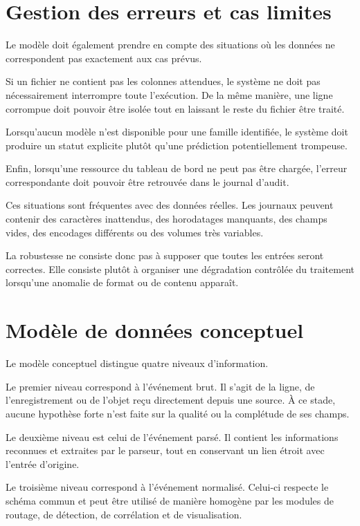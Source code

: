 \section{Gestion des erreurs et cas limites}

Le modèle doit également prendre en compte des situations où les données ne correspondent pas exactement aux cas prévus.

Si un fichier ne contient pas les colonnes attendues, le système ne doit pas nécessairement interrompre toute l'exécution. De la même manière, une ligne corrompue doit pouvoir être isolée tout en laissant le reste du fichier être traité.

Lorsqu'aucun modèle n'est disponible pour une famille identifiée, le système doit produire un statut explicite plutôt qu'une prédiction potentiellement trompeuse.

Enfin, lorsqu'une ressource du tableau de bord ne peut pas être chargée, l'erreur correspondante doit pouvoir être retrouvée dans le journal d'audit.

Ces situations sont fréquentes avec des données réelles. Les journaux peuvent contenir des caractères inattendus, des horodatages manquants, des champs vides, des encodages différents ou des volumes très variables.

La robustesse ne consiste donc pas à supposer que toutes les entrées seront correctes. Elle consiste plutôt à organiser une dégradation contrôlée du traitement lorsqu'une anomalie de format ou de contenu apparaît.

\section{Modèle de données conceptuel}

Le modèle conceptuel distingue quatre niveaux d'information.

Le premier niveau correspond à l'événement brut. Il s'agit de la ligne, de l'enregistrement ou de l'objet reçu directement depuis une source. À ce stade, aucune hypothèse forte n'est faite sur la qualité ou la complétude de ses champs.

Le deuxième niveau est celui de l'événement parsé. Il contient les informations reconnues et extraites par le parseur, tout en conservant un lien étroit avec l'entrée d'origine.

Le troisième niveau correspond à l'événement normalisé. Celui-ci respecte le schéma commun et peut être utilisé de manière homogène par les modules de routage, de détection, de corrélation et de visualisation.

